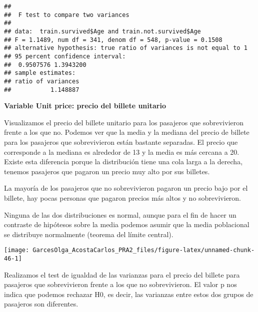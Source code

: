 \documentclass[
]{article}
\newenvironment{Shaded}{\begin{snugshade}}{\end{snugshade}}
\newcommand{\KeywordTok}[1]{\textcolor[rgb]{0.94,0.87,0.69}{#1}}
\newcommand{\NormalTok}[1]{\textcolor[rgb]{0.80,0.80,0.80}{#1}}
\newcommand{\OperatorTok}[1]{\textcolor[rgb]{0.94,0.94,0.82}{#1}}
\newcommand{\StringTok}[1]{\textcolor[rgb]{0.80,0.58,0.58}{#1}}
\begin{document}
\begin{verbatim}
## 
##  F test to compare two variances
## 
## data:  train.survived$Age and train.not.survived$Age
## F = 1.1489, num df = 341, denom df = 548, p-value = 0.1508
## alternative hypothesis: true ratio of variances is not equal to 1
## 95 percent confidence interval:
##  0.9507576 1.3943200
## sample estimates:
## ratio of variances 
##           1.148887
\end{verbatim}

\textbf{Variable Unit price: precio del billete unitario}

Visualizamos el precio del billete unitario para los pasajeros que
sobrevivieron frente a los que no. Podemos ver que la media y la mediana
del precio de billete para los pasajeros que sobrevivieron están
bastante separadas. El precio que corresponde a la mediana es alrededor
de 13 y la media es más cercana a 20. Existe esta diferencia porque la
distribución tiene una cola larga a la derecha, tenemos pasajeros que
pagaron un precio muy alto por sus billetes.

La mayoría de los pasajeros que no sobrevivieron pagaron un precio bajo
por el billete, hay pocas personas que pagaron precios más altos y no
sobrevivieron.

Ninguna de las dos distribuciones es normal, aunque para el fin de hacer
un contraste de hipótesos sobre la media podemos asumir que la media
poblacional se distribuye normalmente (teorema del límite central).

\begin{Shaded}
\end{Shaded}

\begin{center}\texttt{[image: GarcesOlga\_AcostaCarlos\_PRA2\_files/figure-latex/unnamed-chunk-46-1]} \end{center}

Realizamos el test de igualdad de las varianzas para el precio del
billete para pasajeros que sobrevivieron frente a los que no
sobrevivieron. El valor p nos indica que podemos rechazar H0, es decir,
las varianzas entre estos dos grupos de pasajeros son diferentes.
\end{document}
